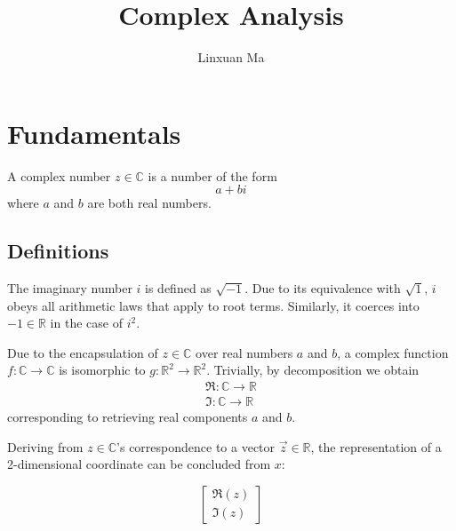 \documentclass[12pt]{article}
\title{Complex Analysis}
\author{Linxuan Ma}
\begin{document}
	\maketitle
	
	\newcommand{\mo}[1]{\lvert #1 \rvert}
	\newcommand{\mos}[1]{\lvert #1 \rvert^2}
	\newcommand{\RR}{\mathbb{R}}
	\newcommand{\p}{\partial}
	
	
	\section{Fundamentals}
	A complex number $z \in \mathbb{C}$ is a number of the form $$a + bi$$ where $a$ and $b$ are both real numbers.
	
	\subsection{Definitions}
	The imaginary number $i$ is defined as $\sqrt{-1}$. Due to its equivalence with $\sqrt{1}$, $i$ obeys all arithmetic laws that apply to root terms. Similarly, it coerces into $-1 \in \RR$ in the case of $i^2$.
	
	Due to the encapsulation of $z \in \mathbb{C}$ over real numbers $a$ and $b$, a complex function $f: \mathbb{C} \to \mathbb{C}$ is isomorphic to $g: \RR^2 \to \RR^2$. Trivially, by decomposition we obtain
	\begin{gather*}
		\Re: \mathbb{C} \to \RR \\
		\Im: \mathbb{C} \to \RR
	\end{gather*}
	corresponding to retrieving real components $a$ and $b$.
	
	Deriving from $z \in \mathbb{C}$'s correspondence to a vector $\vec{z} \in \RR$, the representation of a 2-dimensional coordinate can be concluded from $x$:
	
	\begin{equation*}
		\begin{bmatrix}
			\Re(z) \\ \Im(z)
		\end{bmatrix}
	\end{equation*}
	
\end{document}

